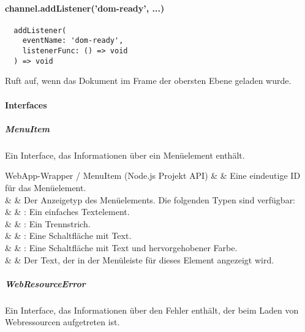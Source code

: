 
\paragraph{channel.addListener('dom-ready', ...)}

\begin{verbatim}
  addListener(
    eventName: 'dom-ready',
    listenerFunc: () => void
  ) => void
\end{verbatim}

Ruft  auf, wenn das Dokument im Frame der obersten Ebene geladen wurde.


\newpage

\paragraph{Interfaces}


\subparagraph{MenuItem}

Ein Interface, das Informationen über ein Menüelement enthält.

\begin{interfacedesc}{WebApp-Wrapper / MenuItem (Node.js Projekt API)}
     &  & Eine eindeutige ID für das Menüelement. \\ \hline
   &  & Der Anzeigetyp des Menüelements. Die folgenden Typen sind verfügbar: \\
              &                           & \textbf{}: Ein einfaches Textelement. \\
              &                           & \textbf{}: Ein Trennstrich. \\
              &                           & \textbf{}: Eine Schaltfläche mit Text. \\
              &                           & \textbf{}: Eine Schaltfläche mit Text und hervorgehobener Farbe. \\ \hline
   &  & Der Text, der in der Menüleiste für dieses Element angezeigt wird. \\ \hline
\end{interfacedesc}

\subparagraph{WebResourceError}

Ein Interface, das Informationen über den Fehler enthält, der beim Laden von Webressourcen aufgetreten ist.

